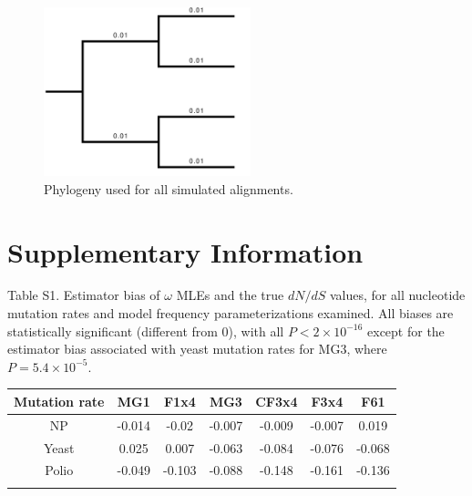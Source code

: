\documentclass[11pt]{article}
\begin{document}
\vspace{2cm}


\begin{figure}[htbp]
	\centerline{\includegraphics[width=6cm]{figures/MainText/simtree.pdf}}
	\caption{\label{tree} Phylogeny used for all simulated alignments.}	
\end{figure}


\clearpage

	
\section*{Supplementary Information}

\vspace{2cm}

\noindent Table S1. Estimator bias of $\omega$ MLEs and the true $dN/dS$ values, for all nucleotide mutation rates and model frequency parameterizations examined. All biases are statistically significant (different from 0), with all $P < 2\times10^{-16}$ except for the estimator bias associated with yeast mutation rates for MG3, where $P = 5.4\times10^{-5}$.
\begin{table}[htbp]
	\begin{tabular}{c c c c c c c}
		\hline\noalign{\smallskip}
		Mutation rate & MG1 & F1x4 & MG3 & CF3x4 & F3x4 & F61 \\
		\hline\noalign{\smallskip}
		NP & -0.014 & -0.02 & -0.007 & -0.009 & -0.007 & 0.019 \\ 
		Yeast & 0.025 & 0.007 & -0.063 & -0.084 & -0.076 & -0.068 \\ 
		Polio & -0.049 & -0.103 & -0.088 & -0.148 & -0.161 & -0.136 \\ 
		\noalign{\smallskip}\hline\noalign{\smallskip}
	\end{tabular}
\end{table}	


\vspace{2.5cm}
\end{document}
